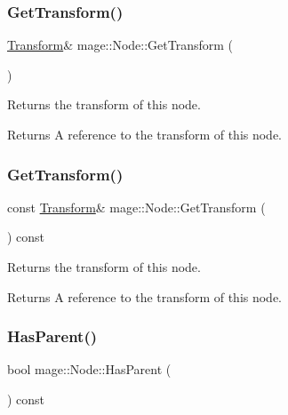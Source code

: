 \subsubsection{\texorpdfstring{Get\+Transform()}{GetTransform()}\hspace{0.1cm}{\footnotesize\ttfamily [1/2]}}
{\footnotesize\ttfamily \hyperlink{classmage_1_1_transform}{Transform}\& mage\+::\+Node\+::\+Get\+Transform (\begin{DoxyParamCaption}{ }\end{DoxyParamCaption})\hspace{0.3cm}{\ttfamily [noexcept]}}

Returns the transform of this node.

\begin{DoxyReturn}{Returns}
A reference to the transform of this node. 
\end{DoxyReturn}
\hypertarget{classmage_1_1_node_aa8e2a3e9361dbdb4be23a8986f4ef082}{}\label{classmage_1_1_node_aa8e2a3e9361dbdb4be23a8986f4ef082} 
\subsubsection{\texorpdfstring{Get\+Transform()}{GetTransform()}\hspace{0.1cm}{\footnotesize\ttfamily [2/2]}}
{\footnotesize\ttfamily const \hyperlink{classmage_1_1_transform}{Transform}\& mage\+::\+Node\+::\+Get\+Transform (\begin{DoxyParamCaption}{ }\end{DoxyParamCaption}) const\hspace{0.3cm}{\ttfamily [noexcept]}}

Returns the transform of this node.

\begin{DoxyReturn}{Returns}
A reference to the transform of this node. 
\end{DoxyReturn}
\hypertarget{classmage_1_1_node_a2c1fe63ec1cb15321f0b0f5879227dcd}{}\label{classmage_1_1_node_a2c1fe63ec1cb15321f0b0f5879227dcd} 
\subsubsection{\texorpdfstring{Has\+Parent()}{HasParent()}}
{\footnotesize\ttfamily bool mage\+::\+Node\+::\+Has\+Parent (\begin{DoxyParamCaption}{ }\end{DoxyParamCaption}) const\hspace{0.3cm}{\ttfamily [noexcept]}}

